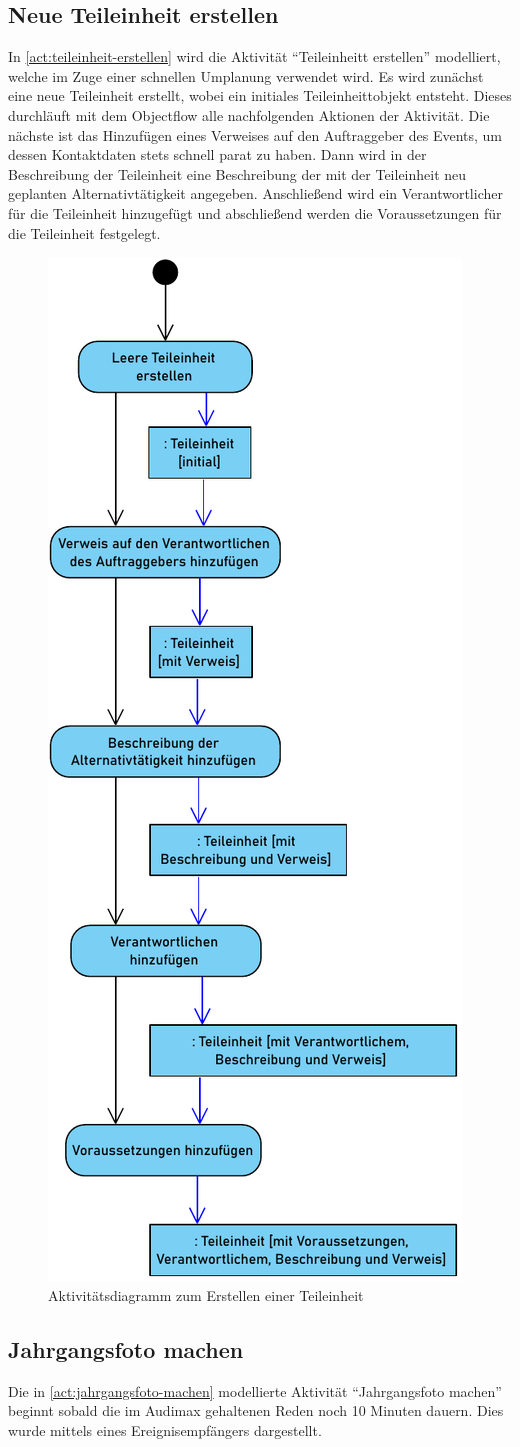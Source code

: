 \subsection{Neue Teileinheit erstellen}
In \autoref{act:teileinheit-erstellen} wird die Aktivität \enquote{Teileinheitt erstellen} modelliert, welche im Zuge einer schnellen Umplanung verwendet wird. Es wird zunächst eine neue Teileinheit erstellt, wobei ein initiales Teileinheittobjekt entsteht. Dieses durchläuft mit dem Objectflow alle nachfolgenden Aktionen der Aktivität. Die nächste ist das Hinzufügen eines Verweises auf den Auftraggeber des Events, um dessen Kontaktdaten stets schnell parat zu haben. Dann wird in der Beschreibung der Teileinheit eine Beschreibung der mit der Teileinheit neu geplanten Alternativtätigkeit angegeben. Anschließend wird ein Verantwortlicher für die Teileinheit hinzugefügt und abschließend werden die Voraussetzungen für die Teileinheit festgelegt.

\begin{figure}[ht!]
    \centering
    \includegraphics[width=0.3\columnwidth]{Bilder/act_Neues_Teilevent_erstellen.pdf}
    \caption{Aktivitätsdiagramm zum Erstellen einer Teileinheit}
    \label{act:teileinheit-erstellen}
\end{figure}

\FloatBarrier

\subsection{Jahrgangsfoto machen}
Die in \autoref{act:jahrgangsfoto-machen} modellierte Aktivität \enquote{Jahrgangsfoto machen} beginnt sobald die im Audimax gehaltenen Reden noch 10 Minuten dauern. Dies wurde mittels eines Ereignisempfängers dargestellt. 

